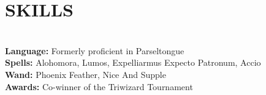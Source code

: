 \documentclass[12pt,letterpaper,two side]{article}
\begin{document}

\section*{SKILLS}

\\\textbf{Language:} Formerly proficient in Parseltongue
\\\textbf{Spells:} Alohomora, Lumos, Expelliarmus Expecto Patronum, Accio
\\\textbf{Wand:} Phoenix Feather, Nice And Supple
\\\textbf{Awards:} Co-winner of the Triwizard Tournament
\end{document}
